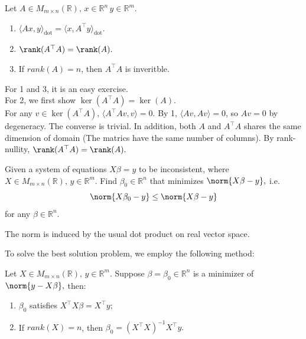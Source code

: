 \begin{theorem} 
    Let $A\in M_{m\times n}(\mathbb{R}),\,x\in\mathbb{R}^n\,y\in\mathbb{R}^m.$
    \begin{enumerate}
        \item $\langle Ax, y\rangle_{\mathrm{dot}} = \langle x, A^\top y\rangle_{\mathrm{dot}}.$
        \item $\rank(A^\top A)=\rank(A).$
        \item If $rank(A)=n$, then $A^\top A$ is inveritble.
    \end{enumerate}
\end{theorem}

\begin{pfbox}
    For 1 and 3, it is an easy exercise.\\
    For 2, we first show $\ker(A^\top A)=\ker(A).$\\
    For any $v\in\ker(A^\top A),\,\langle A^\top Av, v\rangle=0.$ By 1, $\langle Av, Av\rangle=0$, so $Av=0$ by degeneracy. The converse is trivial.
    In addition, both $A$ and $A^\top A$ shares the same dimension of domain (The matrics have the same number of columns). By rank-nullity, $\rank(A^\top A)=\rank(A).$
\end{pfbox}


\begin{question}
    Given a system of equations $X\beta=y$ to be inconsistent, where $X\in M_{m\times n}(\mathbb{R}),\, y\in \mathbb{R}^m$. Find $\beta_0\in\mathbb{R}^n$ that minimizes $\norm{X\beta-y},$ i.e.
    $$\norm{X\beta_0-y}\le\norm{X\beta-y}$$ 
    for any $\beta\in\mathbb{R}^n.$
\end{question}

\begin{remark}
    The norm is induced by the usual dot product on real vector space.
\end{remark}

To solve the best solution problem, we employ the following method:
\begin{theorem}
    Let $X\in M_{m\times n}(\mathbb{R}),\, y\in\mathbb{R}^m.$ Suppose $\beta=\beta_0\in\mathbb{R}^n$ is a minimizer of $\norm{y-X\beta},$ then:
    \begin{enumerate}
        \item $\beta_0$ satisfies $X^\top X\beta=X^\top y;$
        \item If $rank(X)=n$, then $\beta_0=(X^\top X)^{-1}X^\top y.$
    \end{enumerate}
\end{theorem}

